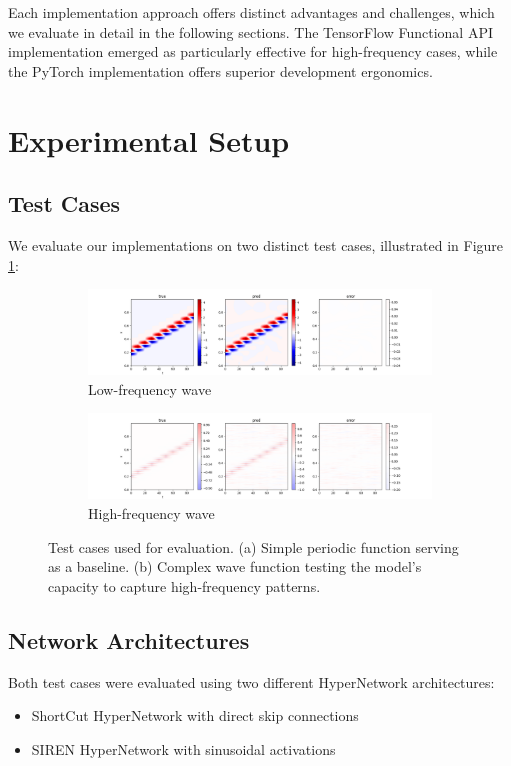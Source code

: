 \documentclass[10pt,journal,compsoc]{IEEEtran}
\begin{document}
Each implementation approach offers distinct advantages and challenges, which we evaluate in detail in the following sections. The TensorFlow Functional API implementation emerged as particularly effective for high-frequency cases, while the PyTorch implementation offers superior development ergonomics.

\section{Experimental Setup}
\subsection{Test Cases}
We evaluate our implementations on two distinct test cases, illustrated in Figure \ref{fig:test_cases}:

\begin{figure}[t]
    \centering
    \begin{subfigure}[b]{0.48\linewidth}
        \includegraphics[width=\linewidth]{../../results/functional-api/low-frequency/vis}
        \caption{Low-frequency wave}
    \end{subfigure}
    \begin{subfigure}[b]{0.48\linewidth}
        \includegraphics[width=\linewidth]{../../results/functional-api/high-frequency/vis}
        \caption{High-frequency wave}
    \end{subfigure}
    \caption{Test cases used for evaluation. (a) Simple periodic function serving as a baseline. (b) Complex wave function testing the model's capacity to capture high-frequency patterns.}
    \label{fig:test_cases}
\end{figure}

\subsection{Network Architectures}
Both test cases were evaluated using two different HyperNetwork architectures:
\begin{itemize}
    \item ShortCut HyperNetwork with direct skip connections
    \item SIREN HyperNetwork with sinusoidal activations
\end{itemize}
\end{document}
